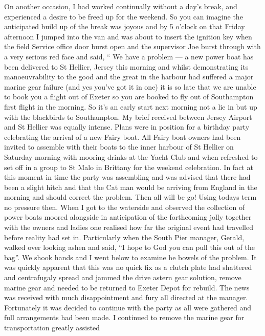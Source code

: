 
On another occasion, I had worked continually without a day's break, and
experienced a desire to be freed up for the weekend. So you can imagine the
anticipated build up of the break was joyous and by 5 o'clock on that Friday
afternoon I jumped into the van and was about to insert the ignition key when
the field Service office door burst open and the supervisor Joe burst through
with a very serious red face and said, `` We have a problem --- a new power
boat has been delivered to St Hellier, Jersey this morning and whilst
demonstrating its manoeuvrability to the good and the great in the harbour had
suffered a major marine gear failure (and yes you've got it in one) it is so
late that we are unable to book you a flight out of Exeter so you are booked to
fly out of Southampton first flight in the morning. So it's an early start next
morning not a lie in but up with the blackbirds to Southampton. My brief
received between Jersey Airport and St Hellier was equally intense. Plans were
in position for a birthday party celebrating the arrival of a new Fairy boat.
All Fairy boat owners had been invited to assemble with their boats to the
inner harbour of St Hellier on Saturday morning with mooring drinks at the
Yacht Club and when refreshed to set off in a group to St Malo in Brittany for
the weekend celebration. In fact at this moment in time the party was
assembling and was advised that there had been a slight hitch and that the Cat
man would be arriving from England in the morning and should correct the
problem. Then all will be go! Using todays term no pressure then. When I got to
the waterside and observed the collection of power boats moored alongside in
anticipation of the forthcoming jolly together with the owners and ladies one
realised how far the original event had travelled before reality had set in.
Particularly when the South Pier manager, Gerald, walked over looking ashen and
said, ``I hope to God you can pull this out of the bag''. We shook hands and I
went below to examine he bowels of the problem. It was quickly apparent that
this was no quick fix as a clutch plate had shattered and centrafugaly spread
and jammed the drive astern gear solution, remove marine gear and needed to be
returned to Exeter Depot for rebuild. The news was received with much
disappointment and fury all directed at the manager. Fortunately it was decided
to continue with the party as all were gathered and full arrangements had been
made. I continued to remove the marine gear for transportation greatly assisted

